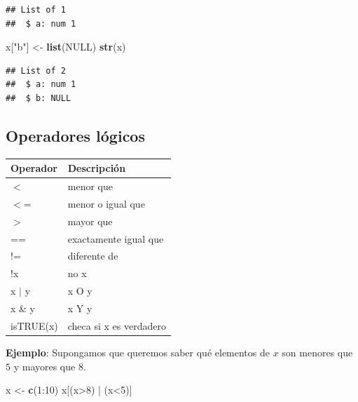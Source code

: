 \documentclass[]{article}
\newenvironment{Shaded}{\begin{snugshade}}{\end{snugshade}}
\newcommand{\KeywordTok}[1]{\textcolor[rgb]{0.13,0.29,0.53}{\textbf{{#1}}}}
\newcommand{\DecValTok}[1]{\textcolor[rgb]{0.00,0.00,0.81}{{#1}}}
\newcommand{\StringTok}[1]{\textcolor[rgb]{0.31,0.60,0.02}{{#1}}}
\newcommand{\OtherTok}[1]{\textcolor[rgb]{0.56,0.35,0.01}{{#1}}}
\newcommand{\NormalTok}[1]{{#1}}
\begin{document}
\begin{verbatim}
## List of 1
##  $ a: num 1
\end{verbatim}

\begin{Shaded}
\begin{Highlighting}[]
\NormalTok{x[}\StringTok{"b"}\NormalTok{] <-}\StringTok{ }\KeywordTok{list}\NormalTok{(}\OtherTok{NULL}\NormalTok{)}
\KeywordTok{str}\NormalTok{(x)}
\end{Highlighting}
\end{Shaded}

\begin{verbatim}
## List of 2
##  $ a: num 1
##  $ b: NULL
\end{verbatim}

\subsection{Operadores lógicos}\label{operadores-logicos}

\begin{table}[ht]
\centering
\begin{tabular}{ll}
  \hline
Operador & Descripción \\ 
  \hline
$<$ & menor que \\ 
  $<$= & menor o igual que \\ 
  $>$ & mayor que \\ 
  == & exactamente igual que \\ 
  != & diferente de \\ 
  !x &  no x \\ 
  x $|$ y & x O y \\ 
  x \& y & x Y y \\ 
  isTRUE(x) & checa si x es verdadero \\ 
   \hline
\end{tabular}
\end{table}

\textbf{Ejemplo}: Supongamos que queremos saber qué elementos de \(x\)
son menores que \(5\) y mayores que \(8\).

\begin{Shaded}
\begin{Highlighting}[]
\NormalTok{x <-}\StringTok{ }\KeywordTok{c}\NormalTok{(}\DecValTok{1}\NormalTok{:}\DecValTok{10}\NormalTok{)}
\NormalTok{x[(x>}\DecValTok{8}\NormalTok{) |}\StringTok{ }\NormalTok{(x<}\DecValTok{5}\NormalTok{)]}
\end{Highlighting}
\end{Shaded}
\end{document}
